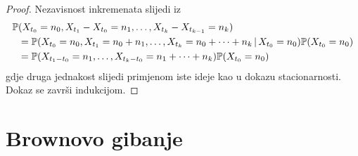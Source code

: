 \documentclass[main.tex]{subfiles}
\begin{document}
\begin{proof}
	Nezavisnost inkremenata slijedi iz
	\begin{equation}
		\begin{aligned}
			\mathbb{P} & (X_{t_0}=n_0, X_{t_1}- X_{t_0} = n_1, \ldots, X_{t_k}-X_{t_{k-1}} = n_k)                                \\
			   & =\mathbb{P}(X_{t_0} = n_0, X_{t_1}=n_0+n_1, \ldots, X_{t_k} = n_0+\cdots+n_k \, \vert \, X_{t_0}=n_0)\mathbb{P}(X_{t_0}=n_0) \\
			   & =\mathbb{P}(X_{t_1-t_0}=n_1,\ldots,X_{t_k-t_0}=n_1+\cdots+n_k)\mathbb{P}(X_{t_0}=n_0)
		\end{aligned}
	\end{equation}
	gdje druga jednakost slijedi primjenom iste ideje kao u dokazu stacionarnosti. Dokaz se završi indukcijom.
\end{proof}

\section{Brownovo gibanje}\label{sec:sp-brownovo}
\end{document}
